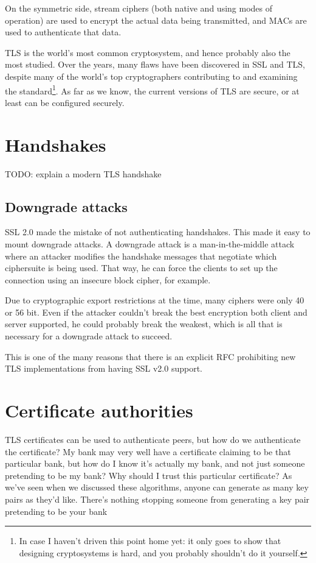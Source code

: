 \documentclass[11pt,ebook,table,dvipsnames]{memoir}
\begin{document}
On the symmetric side, stream ciphers (both native and using modes of
operation) are used to encrypt the actual data being transmitted, and
MACs are used to authenticate that data.

TLS is the world's most common cryptosystem, and hence probably also
the most studied. Over the years, many flaws have been discovered in
SSL and TLS, despite many of the world's top cryptographers
contributing to and examining the standard\footnote{In case I haven't
driven this point home yet: it only goes to show that designing
cryptosystems is hard, and you probably shouldn't do it yourself.}. As
far as we know, the current versions of TLS are secure, or at least
can be configured securely.
\section{Handshakes}
\label{sec-3-1-2}

TODO: explain a modern TLS handshake

\subsection{Downgrade attacks}
\label{sec-3-1-2-1}

SSL 2.0 made the mistake of not authenticating handshakes. This made
it easy to mount downgrade attacks. A downgrade attack is a
man-in-the-middle attack where an attacker modifies the handshake
messages that negotiate which ciphersuite is being used. That way, he
can force the clients to set up the connection using an insecure block
cipher, for example.

Due to cryptographic export restrictions at the time, many ciphers
were only 40 or 56 bit. Even if the attacker couldn't break the best
encryption both client and server supported, he could probably break
the weakest, which is all that is necessary for a downgrade attack to
succeed.

This is one of the many reasons that there is an explicit
RFC\cite{turner:prohibitssl20} prohibiting new TLS implementations
from having SSL v2.0 support.
\section{Certificate authorities}
\label{sec-3-1-3}

TLS certificates can be used to authenticate peers, but how do we
authenticate the certificate? My bank may very well have a certificate
claiming to be that particular bank, but how do I know it's actually
my bank, and not just someone pretending to be my bank? Why should I
trust this particular certificate? As we've seen when we discussed
these algorithms, anyone can generate as many key pairs as they'd
like. There's nothing stopping someone from generating a key pair
pretending to be your bank
\end{document}
